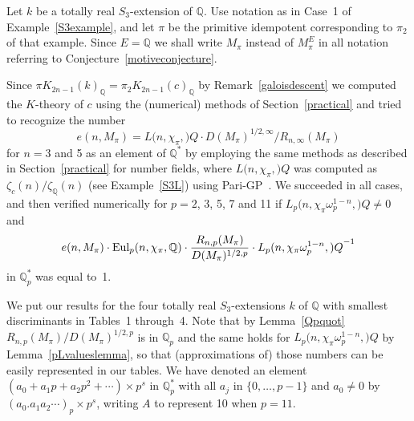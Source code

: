 \documentclass{amsart}
\begin{document}
\begin{example}\label{S3computation}
Let $ k $ be a totally real $ S_3 $-extension of $ {\mathbb Q} $.  Use notation as in Case~1 of Example~\ref{S3example}, and
let $ \pi $ be the primitive idempotent corresponding to $ \pi_2 $ of that example.  Since $ E={\mathbb Q} $ we shall write
$ M_\pi $ instead of $ M_\pi^E $ in all notation referring to Conjecture~\ref{motiveconjecture}.

Since $ \pi {K_{2n-1}(k)_{\mathbb Q}}= \pi_2 {K_{2n-1}(c)_{\mathbb Q}}$ by Remark~\ref{galoisdescent}
we computed the $K$-theory of $ c $ using the (numerical) methods of Section~\ref{practical} and tried to recognize the number
\begin{equation}\label{enM}
e(n,M_\pi)= {L(n,{\chi_\pi},{\mathbb)}Q} \cdot D(M_\pi)^{1/2,\infty} / R_{n,\infty}(M_\pi) 
\end{equation}
for $ n = 3 $ and 5 as an element of $ {\mathbb Q}^* $ by employing the same methods as described in Section~\ref{practical}
for number fields, where $ {L(n,{\chi_\pi},{\mathbb)}Q} $ was computed as $ {\zeta}_c(n)/{\zeta}_{\mathbb Q}(n) $ (see Example~\ref{S3L}) using
Pari-GP~\cite{PARI2}.
We succeeded in all cases, and then verified numerically for $ p=2 $, 3, 5, 7 and 11 if
$ {L_{p}(n,{\chi_\pi\omega_p^{1-n}},{\mathbb)}Q} \ne 0 $ and 
\begin{equation}\label{quotientexp}
e(n,M_\pi) \cdot {\textup{Eul}}_p(n, \chi_\pi, {\mathbb Q}) \cdot \dfrac{R_{n,p}(M_\pi)}{D(M_\pi)^{1/2,p}} 
\cdot {L_{p}(n,{\chi_\pi\omega_p^{1-n}},{\mathbb)}Q} ^{-1}
\end{equation}
in $ {\mathbb Q}_p^* $ was equal to~1.

We put our results for the four totally real $ S_3 $-extensions $ k $ of $ {\mathbb Q} $ with smallest discriminants
in Tables~1 through~4.
Note that by Lemma~\ref{Qpquot} $ R_{n,p}(M_\pi) / D(M_\pi)^{1/2,p} $ is in $ {\mathbb Q}_p $
and the same holds for $  {L_{p}(n,{\chi_\pi\omega_p^{1-n}},{\mathbb)}Q} $ by Lemma~\ref{pLvalueslemma},
so that (approximations of) those numbers can be easily represented in our tables.
We have denoted an element $ (a_0+a_1p+a_2p^2+\cdots) \times p^s $  in $ {\mathbb Q}_p^* $ 
with all $ a_j $ in $ \{0,\dots,p-1\} $ and $ a_0\ne0 $ by $ (a_0.a_1a_2\cdots)_p \times p^s $, writing
$ A $ to represent 10 when $ p = 11 $.


\end{example}
\end{document}
